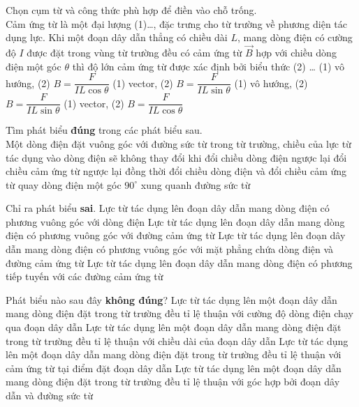 \begin{ex}
	Chọn cụm từ và công thức phù hợp để điền vào chỗ trống.\\
	Cảm ứng từ là một đại lượng (1)\dots, đặc trưng cho từ trường về phương diện tác dụng lực. Khi một đoạn dây dẫn thẳng có chiều dài $L$, mang dòng điện có cường độ $I$ được đặt trong vùng từ trường đều có cảm ứng từ $\vec{B}$ hợp với chiều dòng điện một góc $\theta$ thì độ lớn cảm ứng từ được xác định bởi biểu thức (2) \dots
	\choice
	{(1) vô hướng, (2) $B=\dfrac{F}{IL\cos\theta}$}
	{\True (1) vector, (2) $B=\dfrac{F}{IL\sin\theta}$}
	{(1) vô hướng, (2) $B=\dfrac{F}{IL\sin\theta}$}
	{(1) vector, (2) $B=\dfrac{F}{IL\cos\theta}$}
	\loigiai{}
\end{ex}
\begin{ex}
	Tìm phát biểu \textbf{đúng} trong các phát biểu sau.\\
	Một dòng điện đặt vuông góc với đường sức từ trong từ trường, chiều của lực từ tác dụng vào dòng điện sẽ không thay đổi khi
	\choice
{đổi chiều dòng điện ngược lại}
{đổi chiều cảm ứng từ ngược lại}
{\True đồng thời đổi chiều dòng điện và đổi chiều cảm ứng từ}
{quay dòng điện một góc $90^{\circ}$ xung quanh đường sức từ}
	\loigiai{}
\end{ex}
\begin{ex}
	Chỉ ra phát biểu \textbf{sai}.
	\choice
	{Lực từ tác dụng lên đoạn dây dẫn mang dòng điện có phương vuông góc với dòng điện}
	{Lực từ tác dụng lên đoạn dây dẫn mang dòng điện có phương vuông góc với đường cảm ứng từ}
	{\True Lực từ tác dụng lên đoạn dây dẫn mang dòng điện có phương vuông góc với mặt phẳng chứa dòng điện và đường cảm ứng từ}
	{Lực từ tác dụng lên đoạn dây dẫn mang dòng điện có phương tiếp tuyến với các đường cảm ứng từ}
	\loigiai{}
\end{ex}
\begin{ex}
Phát biểu nào sau đây \textbf{không đúng}?	
	\choice
	{Lực từ tác dụng lên một đoạn dây dẫn mang dòng điện đặt trong từ trường đều tỉ lệ thuận với cường độ dòng điện chạy qua đoạn dây dẫn}
	{Lực từ tác dụng lên một đoạn dây dẫn mang dòng điện đặt trong từ trường đều tỉ lệ thuận với chiều dài của đoạn dây dẫn}
	{Lực từ tác dụng lên một đoạn dây dẫn mang dòng điện đặt trong từ trường đều tỉ lệ thuận với cảm ứng từ tại điểm đặt đoạn dây dẫn}
	{\True Lực từ tác dụng lên một đoạn dây dẫn mang dòng điện đặt trong từ trường đều tỉ lệ thuận với góc hợp bởi đoạn dây dẫn và đường sức từ}
\end{ex}
